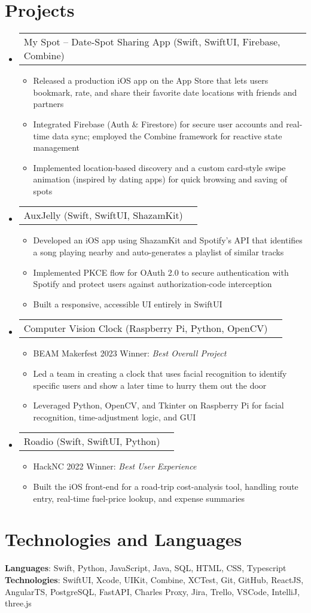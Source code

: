 \documentclass[letterpaper,11pt]{article}
\makeatletter
\newcommand{\resumeItem}[1]{
  \item\small{{#1}}
}
\newcommand{\resumeProjectHeading}[2]{
    \item
    \begin{tabular*}{0.97\textwidth}{l@{\extracolsep{\fill}}r}
      \small#1 & #2 \\
    \end{tabular*}\vspace{-7pt}
}
\newcommand{\resumeSubHeadingListStart}{\begin{itemize}[leftmargin=0.15in, label={}]}
\newcommand{\resumeSubHeadingListEnd}{\end{itemize}}
\newcommand{\resumeItemListStart}{\begin{itemize}}
\newcommand{\resumeItemListEnd}{\end{itemize}\vspace{-5pt}}
\makeatother
\begin{document}
\section{Projects}
  \resumeSubHeadingListStart
    \resumeProjectHeading{My Spot – Date-Spot Sharing App (Swift, SwiftUI, Firebase, Combine)}{}
      \resumeItemListStart
        \resumeItem{Released a production iOS app on the App Store that lets users bookmark, rate, and share their favorite date locations with friends and partners}
        \resumeItem{Integrated Firebase (Auth \& Firestore) for secure user accounts and real-time data sync; employed the Combine framework for reactive state management}
        \resumeItem{Implemented location-based discovery and a custom card-style swipe animation (inspired by dating apps) for quick browsing and saving of spots}
      \resumeItemListEnd
    \resumeProjectHeading{AuxJelly (Swift, SwiftUI, ShazamKit)}{}
      \resumeItemListStart
        \resumeItem{Developed an iOS app using ShazamKit and Spotify’s API that identifies a song playing nearby and auto-generates a playlist of similar tracks}
        \resumeItem{Implemented PKCE flow for OAuth 2.0 to secure authentication with Spotify and protect users against authorization-code interception}
        \resumeItem{Built a responsive, accessible UI entirely in SwiftUI}
      \resumeItemListEnd
    \resumeProjectHeading{Computer Vision Clock (Raspberry Pi, Python, OpenCV)}{}
      \resumeItemListStart
        \resumeItem{BEAM Makerfest 2023 Winner: \emph{Best Overall Project}}
        \resumeItem{Led a team in creating a clock that uses facial recognition to identify specific users and show a later time to hurry them out the door}
        \resumeItem{Leveraged Python, OpenCV, and Tkinter on Raspberry Pi for facial recognition, time-adjustment logic, and GUI}
      \resumeItemListEnd
    \resumeProjectHeading{Roadio (Swift, SwiftUI, Python)}{}
      \resumeItemListStart
        \resumeItem{HackNC 2022 Winner: \emph{Best User Experience}}
        \resumeItem{Built the iOS front-end for a road-trip cost-analysis tool, handling route entry, real-time fuel-price lookup, and expense summaries}
      \resumeItemListEnd
  \resumeSubHeadingListEnd

\section{Technologies and Languages}
  \begin{itemize}[leftmargin=0.15in, label={}]
    \small{\item{
      \textbf{Languages}{: Swift, Python, JavaScript, Java, SQL, HTML, CSS, Typescript} \\
      \textbf{Technologies}{: SwiftUI, Xcode, UIKit, Combine, XCTest, Git, GitHub, ReactJS, AngularTS, PostgreSQL, FastAPI, Charles Proxy, Jira, Trello, VSCode, IntelliJ, three.js}
    }}
  \end{itemize}

\end{document}
